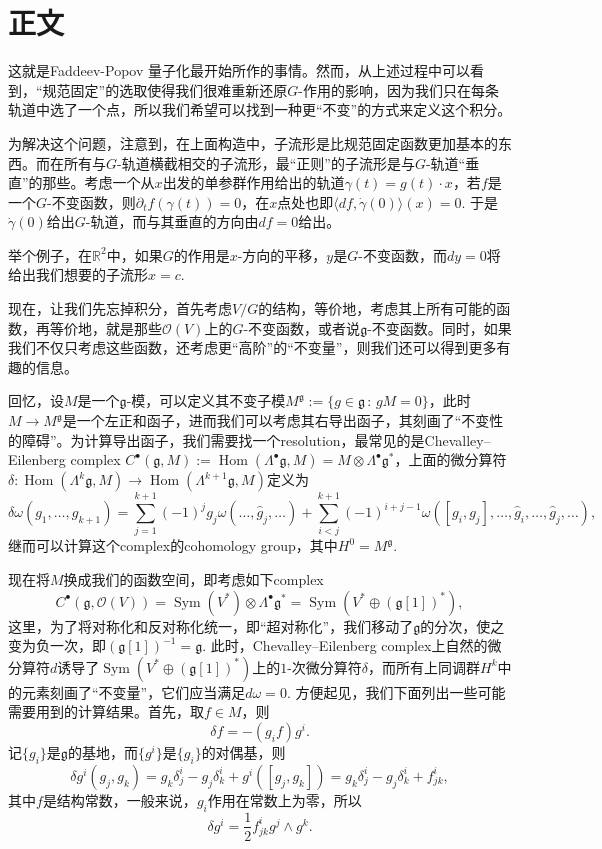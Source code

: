 \documentclass[11pt]{article}
\theoremstyle{definition}
\theoremstyle{plain}
\begin{document}
\section{正文}

这就是Faddeev-Popov 量子化最开始所作的事情。然而，从上述过程中可以看到，“规范固定”的选取使得我们很难重新还原$G$-作用的影响，因为我们只在每条轨道中选了一个点，所以我们希望可以找到一种更“不变”的方式来定义这个积分。

为解决这个问题，注意到，在上面构造中，子流形是比规范固定函数更加基本的东西。而在所有与$G$-轨道横截相交的子流形，最“正则”的子流形是与$G$-轨道“垂直”的那些。考虑一个从$x$出发的单参群作用给出的轨道$\gamma(t)=g(t)\cdot x$，若$f$是一个$G$-不变函数，则$\partial_t f(\gamma(t))=0$，在$x$点处也即$\langle df,\dot{\gamma}(0)\rangle(x)=0$. 于是$\dot \gamma(0)$给出$G$-轨道，而与其垂直的方向由$df=0$给出。

举个例子，在$\mathbb R^2$中，如果$G$的作用是$x$-方向的平移，$y$是$G$-不变函数，而$dy=0$将给出我们想要的子流形$x=c$.

现在，让我们先忘掉积分，首先考虑$V/G$的结构，等价地，考虑其上所有可能的函数，再等价地，就是那些$\mathscr O(V)$上的$G$-不变函数，或者说$\mathfrak{g}$-不变函数。同时，如果我们不仅只考虑这些函数，还考虑更“高阶”的“不变量”，则我们还可以得到更多有趣的信息。

回忆，设$M$是一个$\mathfrak g$-模，可以定义其不变子模$M^{\mathfrak g}:=\{g \in \mathfrak g\,:\, gM=0\}$，此时$M\to M^{\mathfrak g}$是一个左正和函子，进而我们可以考虑其右导出函子，其刻画了“不变性的障碍”。为计算导出函子，我们需要找一个resolution，最常见的是Chevalley–Eilenberg complex $C^\bullet(\mathfrak g,M):=\operatorname{Hom}(\Lambda^\bullet \mathfrak g,M)=M\otimes \Lambda^\bullet \mathfrak g^*$，上面的微分算符$\delta:\operatorname{Hom}(\Lambda^k \mathfrak g,M)\to \operatorname{Hom}(\Lambda^{k+1} \mathfrak g,M)$定义为
\[
    \delta\omega(g_1,\dots,g_{k+1})=\sum_{j=1}^{k+1} (-1)^{j}g_j\omega(\dots,\hat{g}_j,\dots)+\sum_{i<j}^{k+1} (-1)^{i+j-1}\omega([g_i,g_j],\dots,\hat{g}_i,\dots,\hat{g}_j,\dots),
\]继而可以计算这个complex的cohomology group，其中$H^0=M^{\mathfrak g}$.

现在将$M$换成我们的函数空间，即考虑如下complex
\[
C^\bullet(\mathfrak g,\mathcal O(V))=\operatorname{Sym}(V^*)\otimes \Lambda^\bullet \mathfrak g^*
=\operatorname{Sym}(V^*\oplus (\mathfrak g[1])^*),
\]这里，为了将对称化和反对称化统一，即“超对称化”，我们移动了$\mathfrak g$的分次，使之变为负一次，即$(\mathfrak g[1])^{-1}=\mathfrak g$. 此时，Chevalley–Eilenberg complex上自然的微分算符$d$诱导了$\operatorname{Sym}(V^*\oplus (\mathfrak g[1])^*)$上的$1$-次微分算符$\delta$，而所有上同调群$H^k$中的元素刻画了“不变量”，它们应当满足$d\omega=0$. 方便起见，我们下面列出一些可能需要用到的计算结果。首先，取$f\in M$，则
\[
    \delta f=-(g_if)g^i.
\]
记$\{g_i\}$是$\mathfrak g$的基地，而$\{g^i\}$是$\{g_i\}$的对偶基，则
\[
    \delta g^i(g_j,g_k)=g_k\delta^i_j-g_j\delta^i_{k}+g^i([g_j,g_k])=g_k\delta^i_j-g_j\delta^i_{k}+f^i_{jk},
\]
其中$f$是结构常数，一般来说，$g_i$作用在常数上为零，所以
\[
    \delta g^i=\frac 12 f^i_{jk}g^j\wedge g^k.
\]
\end{document}
